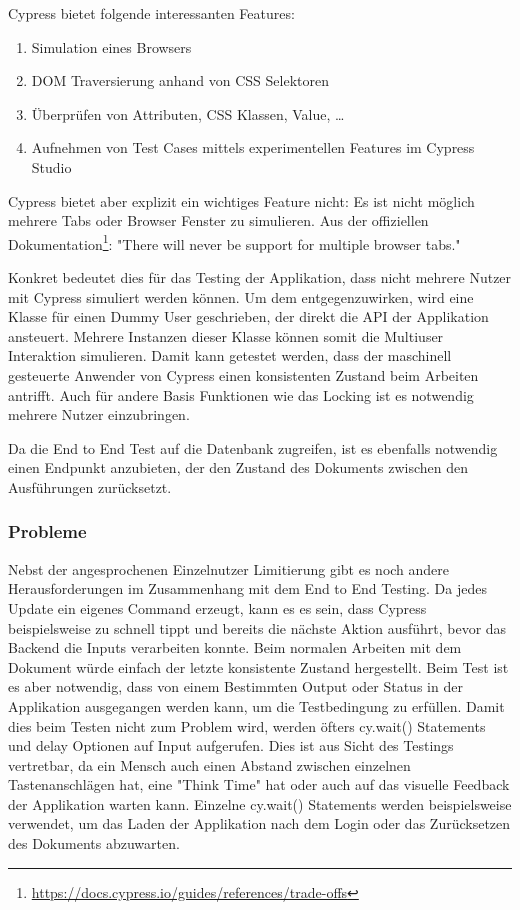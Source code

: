 Cypress bietet folgende interessanten Features:

\begin{enumerate}
    \item Simulation eines Browsers
    \item DOM Traversierung anhand von CSS Selektoren
    \item \"Uberpr\"ufen von Attributen, CSS Klassen, Value, \ldots
    \item Aufnehmen von Test Cases mittels experimentellen Features im Cypress Studio
\end{enumerate}

Cypress bietet aber explizit ein wichtiges Feature nicht: Es ist nicht m\"oglich mehrere Tabs oder Browser Fenster zu simulieren.
Aus der offiziellen Dokumentation\footnote{\href{https://docs.cypress.io/guides/references/trade-offs}{https://docs.cypress.io/guides/references/trade-offs}}: "There will never be support for multiple browser tabs."

Konkret bedeutet dies f\"ur das Testing der Applikation, dass nicht mehrere Nutzer mit Cypress simuliert werden k\"onnen.
Um dem entgegenzuwirken, wird eine Klasse f\"ur einen Dummy User geschrieben, der direkt die API der Applikation ansteuert.
Mehrere Instanzen dieser Klasse k\"onnen somit die Multiuser Interaktion simulieren.
Damit kann getestet werden, dass der maschinell gesteuerte Anwender von Cypress einen konsistenten Zustand beim Arbeiten antrifft.
Auch f\"ur andere Basis Funktionen wie das Locking ist es notwendig mehrere Nutzer einzubringen.

Da die End to End Test auf die Datenbank zugreifen, ist es ebenfalls notwendig einen Endpunkt anzubieten, der den Zustand des Dokuments zwischen den Ausf\"uhrungen zur\"ucksetzt.

\subsubsection{Probleme}
Nebst der angesprochenen Einzelnutzer Limitierung gibt es noch andere Herausforderungen im Zusammenhang mit dem End to End Testing.
Da jedes Update ein eigenes Command erzeugt, kann es es sein, dass Cypress beispielsweise zu schnell tippt und bereits die n\"achste Aktion ausf\"uhrt, bevor das Backend die Inputs verarbeiten konnte.
Beim normalen Arbeiten mit dem Dokument w\"urde einfach der letzte konsistente Zustand hergestellt.
Beim Test ist es aber notwendig, dass von einem Bestimmten Output oder Status in der Applikation ausgegangen werden kann, um die Testbedingung zu erf\"ullen.
Damit dies beim Testen nicht zum Problem wird, werden \"ofters cy.wait() Statements und delay Optionen auf Input aufgerufen.
Dies ist aus Sicht des Testings vertretbar, da ein Mensch auch einen Abstand zwischen einzelnen Tastenanschl\"agen hat, eine "Think Time" hat oder auch auf das visuelle Feedback der Applikation warten kann.
Einzelne cy.wait() Statements werden beispielsweise verwendet, um das Laden der Applikation nach dem Login oder das Zur\"ucksetzen des Dokuments abzuwarten.

